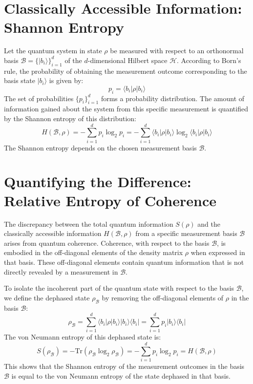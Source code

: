 \documentclass{article}
\theoremstyle{definition}
\begin{document}
	\section{Classically Accessible Information: Shannon Entropy}
	
	Let the quantum system in state $\rho$ be measured with respect to an orthonormal basis $\mathcal{B} = \{|b_i\rangle\}_{i=1}^d$ of the $d$-dimensional Hilbert space $\mathcal{H}$. According to Born's rule, the probability of obtaining the measurement outcome corresponding to the basis state $|b_i\rangle$ is given by:
	\begin{equation}
		p_i = \langle b_i|\rho|b_i\rangle
		\label{eq:born_rule}
	\end{equation}
	The set of probabilities $\{p_i\}_{i=1}^d$ forms a probability distribution. The amount of information gained about the system from this specific measurement is quantified by the Shannon entropy of this distribution:
	\begin{equation}
		H(\mathcal{B}, \rho) = -\sum_{i=1}^d p_i \log_2 p_i = -\sum_{i=1}^d \langle b_i|\rho|b_i\rangle \log_2 \langle b_i|\rho|b_i\rangle
		\label{eq:shannon_entropy}
	\end{equation}
	The Shannon entropy depends on the chosen measurement basis $\mathcal{B}$.
	
	\section{Quantifying the Difference: Relative Entropy of Coherence}
	
	The discrepancy between the total quantum information $S(\rho)$ and the classically accessible information $H(\mathcal{B}, \rho)$ from a specific measurement basis $\mathcal{B}$ arises from quantum coherence. Coherence, with respect to the basis $\mathcal{B}$, is embodied in the off-diagonal elements of the density matrix $\rho$ when expressed in that basis. These off-diagonal elements contain quantum information that is not directly revealed by a measurement in $\mathcal{B}$.
	
	To isolate the incoherent part of the quantum state with respect to the basis $\mathcal{B}$, we define the dephased state $\rho_{\mathcal{B}}$ by removing the off-diagonal elements of $\rho$ in the basis $\mathcal{B}$:
	\begin{equation}
		\rho_{\mathcal{B}} = \sum_{i=1}^d \langle b_i|\rho|b_i\rangle |b_i\rangle\langle b_i| = \sum_{i=1}^d p_i |b_i\rangle\langle b_i|
		\label{eq:dephased_state}
	\end{equation}
	The von Neumann entropy of this dephased state is:
	\begin{equation}
		S(\rho_{\mathcal{B}}) = -\text{Tr}(\rho_{\mathcal{B}} \log_2 \rho_{\mathcal{B}}) = -\sum_{i=1}^d p_i \log_2 p_i = H(\mathcal{B}, \rho)
		\label{eq:entropy_dephased_state}
	\end{equation}
	This shows that the Shannon entropy of the measurement outcomes in the basis $\mathcal{B}$ is equal to the von Neumann entropy of the state dephased in that basis.
	
\end{document}
